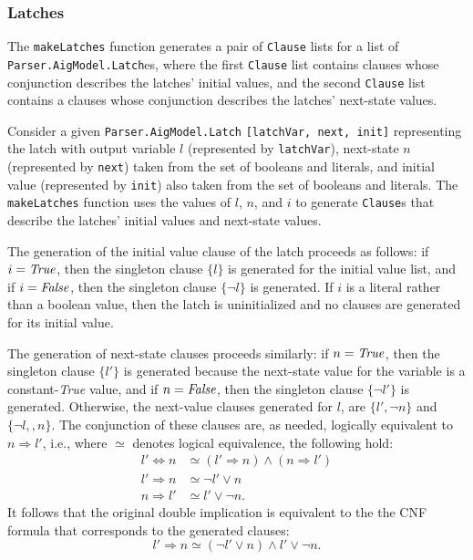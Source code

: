 \documentclass[12pt,a4paper,twoside,openright]{report}
\begin{document}
{\subsubsection{Latches}
The \verb,makeLatches, function generates a pair of \verb,Clause, lists
for a list of \verb,Parser.AigModel.Latch,es, where the first \verb,Clause, list contains
clauses whose conjunction describes the latches' initial values, and the second \verb,Clause, list
contains a clauses whose conjunction describes the latches' next-state values.

Consider a given \verb,Parser.AigModel.Latch, \verb.[latchVar, next, init]. representing the latch with
output variable $l$ (represented by \verb,latchVar,), next-state $n$ (represented
by \verb,next,) taken from the set of booleans and literals, and initial value (represented by \verb,init,)
also taken from the set of booleans and literals. The \verb,makeLatches, function uses the
values of $l$, $n$, and $i$ to generate \verb,Clause,s that describe the latches' initial values and
next-state values.

The generation of the initial value clause of the latch proceeds as follows: if $i = {\it True}$,
then the singleton clause $\{l\}$ is generated for the initial value list, and if $i = {\it False}$,
then the singleton clause $\{\neg l\}$ is generated.
If $i$ is a literal rather than a boolean value, then the latch is
uninitialized and no clauses are generated for its initial value.

The generation of next-state clauses proceeds similarly: if $n = {\it True}$, then the singleton clause
$\{l'\}$ is generated because the next-state value for the variable is a constant-{\it True} value,
and if $n = {\it False}$, then the singleton clause $\{\neg l'\}$ is generated.
Otherwise, the next-value clauses generated for $l$, are $\{l', \neg n\}$
and $\{\neg l,, n\}$. The conjunction of these clauses are, as needed, logically equivalent
to $n \Rightarrow l'$, i.e., where $\simeq$ denotes logical equivalence,
the following hold:
\begin{align*}
l' \Leftrightarrow n &\simeq (l' \Rightarrow n) \wedge (n \Rightarrow l')\\
l' \Rightarrow n &\simeq \neg l' \vee n\\
n \Rightarrow l' &\simeq l' \vee \neg n.
\end{align*}
It follows that the original double implication is equivalent to the 
the CNF formula that corresponds to the generated clauses:
$$l' \Rightarrow n \simeq (\neg l' \vee n) \wedge l' \vee \neg n.$$

}
\end{document}
